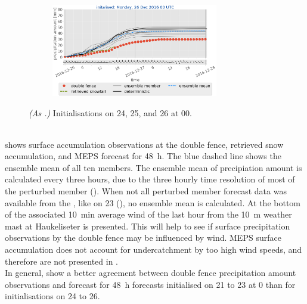 \begin{figure}[H]
\begin{subfigure}[t]{0.99\textwidth}
		\caption{}\label{fig:sfc_acc26}
	\end{subfigure}
	\begin{subfigure}[t]{\textwidth}
		\centering
		\includegraphics[trim={1.2cm 0cm 1.1cm 21.4cm},clip,width=0.8\textwidth]{./fig_sfc_acc/acc_wind_20161226_00}
	\end{subfigure}
	\caption{\textit{(As .)} Initialisations on \num{24}, \num{25}, and \SI{26}{\dec} at \SI{00}{\UTC}. }
\end{figure}
\noindent
\\
 shows surface accumulation observations at the double fence, retrieved snow accumulation, and MEPS forecast for \SI{48}{\hour}.  
The blue dashed line shows the ensemble mean of all ten members. The ensemble mean of precipiation amount is calculated every three hours, due to the three hourly time resolution of most of the perturbed member ().
When not all perturbed member forecast data was available from the \citet{norwegian_meteorological_institute_met_2016}, like on \SI{23}{\dec} (), no ensemble mean is calculated. 
At the bottom of  the associated \SI{10}{\minute} average wind of the last hour from the \SI{10}{\metre} weather mast at Haukeliseter is presented. This will help to see if surface precipitation observations by the double fence may be influenced by wind. MEPS surface accumulation does not account for undercatchment by too high wind speeds, and therefore are not presented in .
\\
In general,  show a better agreement between double fence precipitation amount observations and forecast for \SI{48}{\hour} forecasts initialised on \num{21} to \SI{23}{\dec} at \SI{0}{\UTC} than for initialisations on \num{24} to \SI{26}{\dec}. 
